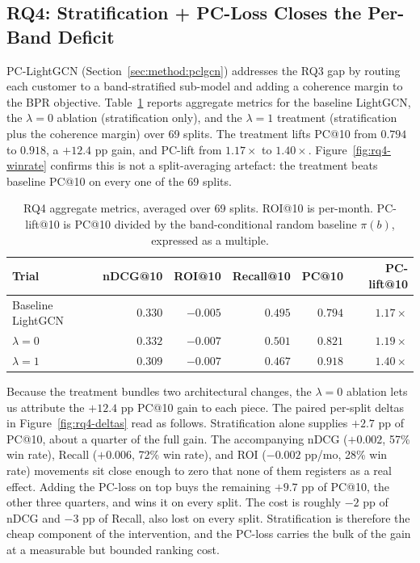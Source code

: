 \subsection{RQ4: Stratification + PC-Loss Closes the Per-Band Deficit}
\label{sec:results:rq4}

PC-LightGCN (Section~\ref{sec:method:pclgcn}) addresses the RQ3 gap by routing each customer to a band-stratified sub-model and adding a coherence margin to the BPR objective. Table~\ref{tab:rq4-aggregate} reports aggregate metrics for the baseline LightGCN, the $\lambda = 0$ ablation (stratification only), and the $\lambda = 1$ treatment (stratification plus the coherence margin) over 69 splits. The treatment lifts PC@10 from $0.794$ to $0.918$, a $+12.4$ pp gain, and PC-lift from $1.17\times$ to $1.40\times$. Figure~\ref{fig:rq4-winrate} confirms this is not a split-averaging artefact: the treatment beats baseline PC@10 on every one of the 69 splits.

\begin{table}[!t]
\centering
\small
\begin{tabular}{lrrrrr}
\toprule
Trial & nDCG@10 & ROI@10 & Recall@10 & PC@10 & PC-lift@10 \\
\midrule
Baseline LightGCN      & $0.330$ & $-0.005$ & $0.495$ & $0.794$ & $1.17\times$ \\
$\lambda = 0$ & $0.332$ & $-0.007$ & $0.501$ & $0.821$ & $1.19\times$ \\
$\lambda = 1$ & $0.309$ & $-0.007$ & $0.467$ & $0.918$ & $1.40\times$ \\
\bottomrule
\end{tabular}
\caption{RQ4 aggregate metrics, averaged over 69 splits. ROI@10 is per-month. PC-lift@10 is PC@10 divided by the band-conditional random baseline $\pi(b)$, expressed as a multiple.}
\label{tab:rq4-aggregate}
\end{table}

Because the treatment bundles two architectural changes, the $\lambda = 0$ ablation lets us attribute the $+12.4$ pp PC@10 gain to each piece. The paired per-split deltas in Figure~\ref{fig:rq4-deltas} read as follows. Stratification alone supplies $+2.7$ pp of PC@10, about a quarter of the full gain. The accompanying nDCG ($+0.002$, 57\% win rate), Recall ($+0.006$, 72\% win rate), and ROI ($-0.002$ pp/mo, 28\% win rate) movements sit close enough to zero that none of them registers as a real effect. Adding the PC-loss on top buys the remaining $+9.7$ pp of PC@10, the other three quarters, and wins it on every split. The cost is roughly $-2$ pp of nDCG and $-3$ pp of Recall, also lost on every split. Stratification is therefore the cheap component of the intervention, and the PC-loss carries the bulk of the gain at a measurable but bounded ranking cost.

